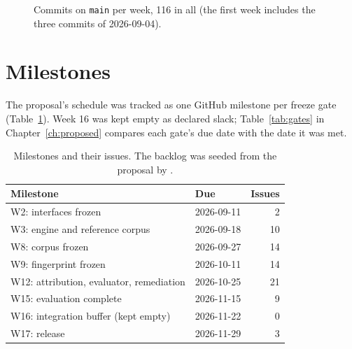 \begin{figure}[H]
\centering
{}
\caption{Commits on \texttt{main} per week, 116 in all (the first week includes the three commits of 2026-09-04).}
\label{fig:commits}
\end{figure}

\section{Milestones}

The proposal's schedule was tracked as one GitHub milestone per freeze gate (Table~\ref{tab:milestones}). Week 16 was kept empty as declared slack; Table~\ref{tab:gates} in Chapter~\ref{ch:proposed} compares each gate's due date with the date it was met.


\begin{table}[H]
\centering\small
\begin{tabular}{@{}llr@{}}
\toprule
\textbf{Milestone} & \textbf{Due} & \textbf{Issues} \\
\midrule
W2: interfaces frozen & 2026-09-11 & 2 \\
W3: engine and reference corpus & 2026-09-18 & 10 \\
W8: corpus frozen & 2026-09-27 & 14 \\
W9: fingerprint frozen & 2026-10-11 & 14 \\
W12: attribution, evaluator, remediation & 2026-10-25 & 21 \\
W15: evaluation complete & 2026-11-15 & 9 \\
W16: integration buffer (kept empty) & 2026-11-22 & 0 \\
W17: release & 2026-11-29 & 3 \\
\bottomrule
\end{tabular}
\caption{Milestones and their issues. The backlog was seeded from the proposal by .}
\label{tab:milestones}
\end{table}

